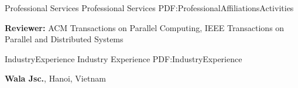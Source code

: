 \documentclass[letterpaper,MMMyyyy,nonstopmode]{simpleresumecv}
\begin{document}
\begin{Body}
\Section
{Professional Services}
{Professional Services}
{PDF:ProfessionalAffiliationsActivities}

\Entry
{\textbf{Reviewer:} ACM Transactions on Parallel Computing, 
IEEE Transactions on Parallel and Distributed Systems}



\begin{comment}

\Section
{Campus Activities}
{Campus Activities}
{PDF:CampusActivities}

\Entry
\href{http://www.example.com/my-club}
{\textbf{First Volunteers Club}},
First American University

\Gap
\BulletItem
President
\hfill
\DatestampYMD{2006}{08}{15} --
\DatestampYMD{2007}{08}{15}
\begin{Detail}
\SubBulletItem
Lorem ipsum dolor sit amet, consectetur adipiscing elit.
\SubBulletItem
Curabitur vitae laoreet velit, vel ultricies est. Nam nec elit ac ante facilisis ultrices.
\SubBulletItem
Integer sit amet turpis dolor. Lorem ipsum dolor sit amet, consectetur adipiscing elit. Nunc at orci eu leo vulputate finibus sed et sem.
\SubBulletItem
Suspendisse volutpat sapien et mi cursus, gravida ornare mauris sollicitudin.
\end{Detail}

\end{comment}



\Section
{Industry\newline Experience}
{Industry Experience}
{PDF:IndustryExperience}

\Entry
{\textbf{Wala Jsc.}}, Hanoi, Vietnam


\end{Body}
\end{document}
